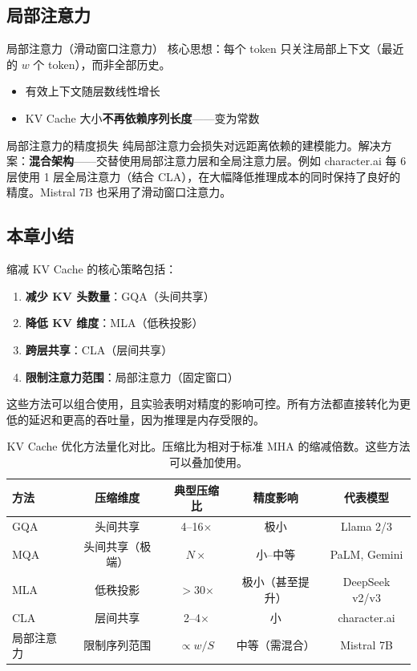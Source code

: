 \documentclass[a4paper]{article}
\begin{document}
\subsection{局部注意力}

\begin{importantbox}{局部注意力（滑动窗口注意力）}
核心思想：每个 token 只关注局部上下文（最近的 $w$ 个 token），而非全部历史。
\begin{itemize}
    \item 有效上下文随层数线性增长
    \item KV Cache 大小\textbf{不再依赖序列长度}——变为常数
\end{itemize}
\end{importantbox}

\begin{warningbox}{局部注意力的精度损失}
纯局部注意力会损失对远距离依赖的建模能力。解决方案：\textbf{混合架构}——交替使用局部注意力层和全局注意力层。例如 character.ai 每 6 层使用 1 层全局注意力（结合 CLA），在大幅降低推理成本的同时保持了良好的精度。Mistral 7B 也采用了滑动窗口注意力。
\end{warningbox}

\subsection{本章小结}

缩减 KV Cache 的核心策略包括：
\begin{enumerate}
    \item \textbf{减少 KV 头数量}：GQA（头间共享）
    \item \textbf{降低 KV 维度}：MLA（低秩投影）
    \item \textbf{跨层共享}：CLA（层间共享）
    \item \textbf{限制注意力范围}：局部注意力（固定窗口）
\end{enumerate}
这些方法可以组合使用，且实验表明对精度的影响可控。所有方法都直接转化为更低的延迟和更高的吞吐量，因为推理是内存受限的。

\begin{table}[H]
\centering
\begin{tabular}{lcccc}
\toprule
\textbf{方法} & \textbf{压缩维度} & \textbf{典型压缩比} & \textbf{精度影响} & \textbf{代表模型} \\
\midrule
GQA & 头间共享 & 4--16$\times$ & 极小 & Llama 2/3 \\
MQA & 头间共享（极端） & $N\times$ & 小--中等 & PaLM, Gemini \\
MLA & 低秩投影 & $>$30$\times$ & 极小（甚至提升） & DeepSeek v2/v3 \\
CLA & 层间共享 & 2--4$\times$ & 小 & character.ai \\
局部注意力 & 限制序列范围 & $\propto w/S$ & 中等（需混合） & Mistral 7B \\
\bottomrule
\end{tabular}
\caption{KV Cache 优化方法量化对比。压缩比为相对于标准 MHA 的缩减倍数。这些方法可以叠加使用。}
\end{table}
\end{document}
